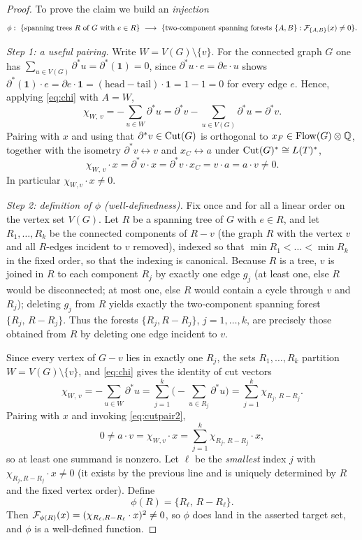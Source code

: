 \begin{proof}
To prove the claim we build an \emph{injection}
\[
\phi:\ \{\text{spanning trees $R$ of $G$ with $e\in R$}\}\ \longrightarrow\
\{\text{two-component spanning forests }\{A,B\}:\mathcal{F}_{\{A,B\}}(x)\ne0\}.
\]

\smallskip\noindent\emph{Step 1: a useful pairing.}  Write $W=V(G)\setminus\{v\}$.  For the
connected graph $G$ one has $\sum_{u\in V(G)}\partial^\ast u=\partial^\ast(\mathbf 1)=0$,
since $\partial^\ast u\cdot e=\partial e\cdot u$ shows
$\partial^\ast(\mathbf 1)\cdot e=\partial e\cdot\mathbf 1=(\text{head}-\text{tail})\cdot
\mathbf 1=1-1=0$ for every edge $e$.  Hence, applying \eqref{eq:chi} with $A=W$,
\[
\chi_{W,\,v}=-\sum_{u\in W}\partial^\ast u
=\partial^\ast v-\sum_{u\in V(G)}\partial^\ast u=\partial^\ast v .
\]
Pairing with $x$ and using that $\partial^\ast v\in\operatorname{Cut}(G)$ is orthogonal to
$x_F\in\operatorname{Flow}(G)\otimes\mathbb{Q}$, together with the isometry $\partial^\ast v\leftrightarrow v$ and
$x_C\leftrightarrow a$ under $\operatorname{Cut}(G)^\ast\cong L(T)^\ast$,
\begin{equation}
\label{eq:cutpair2}
\chi_{W,\,v}\cdot x=\partial^\ast v\cdot x=\partial^\ast v\cdot x_C=v\cdot a=a\cdot v\ne0 .
\end{equation}
In particular $\chi_{W,v}\cdot x\ne0$.

\smallskip\noindent\emph{Step 2: definition of $\phi$ (well-definedness).}  Fix once and for
all a linear order on the vertex set $V(G)$.  Let $R$ be a spanning tree of $G$ with $e\in R$,
and let $R_1,\dots,R_k$ be the connected components of $R-v$ (the graph $R$ with the vertex
$v$ and all $R$-edges incident to $v$ removed), indexed so that $\min R_1<\dots<\min R_k$ in
the fixed order, so that the indexing is canonical.  Because $R$ is a tree, $v$ is joined in
$R$ to each component $R_j$ by exactly one edge $g_j$ (at least one, else $R$ would be
disconnected; at most one, else $R$ would contain a cycle through $v$ and $R_j$); deleting
$g_j$ from $R$ yields exactly the two-component spanning forest $\{R_j,\,R-R_j\}$.  Thus the
forests $\{R_j,R-R_j\}$, $j=1,\dots,k$, are precisely those obtained from $R$ by deleting one
edge incident to $v$.

Since every vertex of $G-v$ lies in exactly one $R_j$, the sets $R_1,\dots,R_k$ partition
$W=V(G)\setminus\{v\}$, and \eqref{eq:chi} gives the identity of cut vectors
\[
\chi_{W,\,v}=-\sum_{u\in W}\partial^\ast u
=\sum_{j=1}^k\Big(-\sum_{u\in R_j}\partial^\ast u\Big)
=\sum_{j=1}^k\chi_{R_j,\,R-R_j}.
\]
Pairing with $x$ and invoking \eqref{eq:cutpair2},
\[
0\ne a\cdot v=\chi_{W,v}\cdot x=\sum_{j=1}^k\chi_{R_j,\,R-R_j}\cdot x,
\]
so at least one summand is nonzero.  Let $\ell$ be the \emph{smallest} index $j$ with
$\chi_{R_j,R-R_j}\cdot x\ne0$ (it exists by the previous line and is uniquely determined by
$R$ and the fixed vertex order).  Define
\[
\phi(R)=\{R_\ell,\,R-R_\ell\}.
\]
Then $\mathcal{F}_{\phi(R)}(x)=(\chi_{R_\ell,R-R_\ell}\cdot x)^2\ne0$, so $\phi$ does land in the
asserted target set, and $\phi$ is a well-defined function.


\end{proof}
